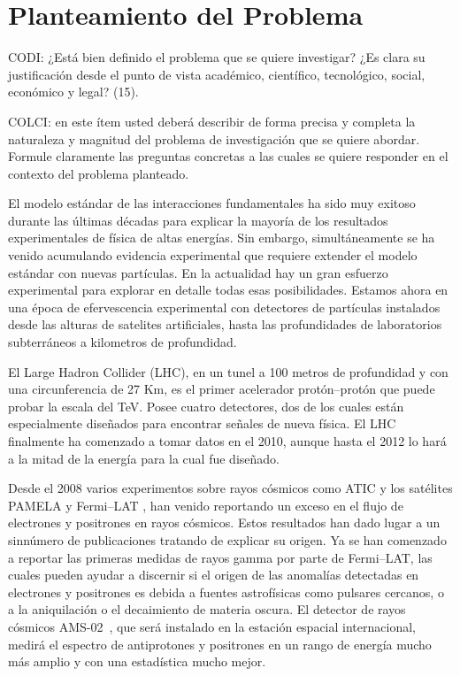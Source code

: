 \section{Planteamiento del Problema }
\begin{instrucciones}
  CODI: ¿Está bien definido el problema que se quiere investigar? ¿Es clara su justificación desde el punto de vista académico, científico, tecnológico, social, económico y legal? (15).

  COLCI: en este ítem usted deberá describir de forma precisa y completa la
  naturaleza y magnitud del problema de investigación que se quiere
  abordar. Formule claramente las preguntas concretas a las cuales se
  quiere responder en el contexto del problema planteado.
\end{instrucciones}
El modelo estándar de las interacciones fundamentales ha sido muy
exitoso durante las últimas décadas para explicar la mayoría de los
resultados experimentales de física de altas energías. Sin embargo,
simultáneamente se ha venido acumulando evidencia experimental que
requiere extender el modelo estándar con nuevas partículas. En la
actualidad hay un gran esfuerzo experimental para explorar en detalle
todas esas posibilidades. Estamos ahora en una época de efervescencia
experimental con detectores de partículas instalados desde las alturas
de satelites artificiales, hasta las profundidades de laboratorios
subterráneos a kilometros de profundidad. 

El Large Hadron Collider (LHC), en un tunel a 100 metros de profundidad y
con una circunferencia de 27 Km, es el primer acelerador
protón--protón que puede probar la escala del TeV.  Posee cuatro
detectores, dos de los cuales están especialmente diseñados para
encontrar señales de nueva física. El LHC finalmente ha comenzado a
tomar datos en el 2010, aunque hasta el 2012 lo hará a la mitad de la
energía para la cual fue diseñado.

Desde el 2008 varios experimentos sobre rayos cósmicos como ATIC
\cite{:2008zzr} y los satélites PAMELA \cite{Adriani:2008zr} y
Fermi--LAT \cite{Abdo:2009zk}, han venido reportando un exceso en el
flujo de electrones y positrones en rayos cósmicos. Estos resultados
han dado lugar a un sinnúmero de publicaciones tratando de explicar su
origen. Ya se han comenzado a reportar las primeras medidas de rayos
gamma por parte de Fermi--LAT, las cuales pueden ayudar a discernir si
el origen de las anomalías detectadas en electrones y positrones es
debida a fuentes astrofísicas como pulsares cercanos, o a la
aniquilación o el decaimiento de materia oscura. El detector de rayos
cósmicos AMS-02~\cite{ams:2009}, que será instalado en la estación
espacial internacional, medirá el espectro de antiprotones y
positrones en un rango de energía mucho más amplio y con una
estadística mucho mejor.  

